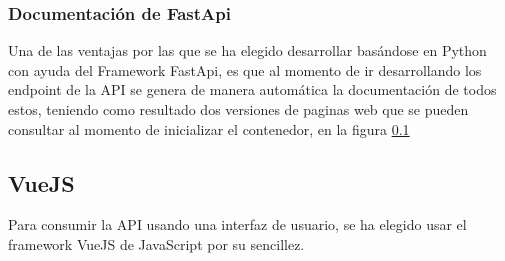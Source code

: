 \clearpage

\subsubsection{Documentación de FastApi}
Una de las ventajas por las que se ha elegido desarrollar basándose en Python con ayuda del Framework FastApi, es que al momento de ir desarrollando los endpoint de la API se genera de manera automática la documentación de todos estos, teniendo como resultado dos versiones de paginas web que se pueden consultar al momento de inicializar el contenedor, en la figura \ref{}

\subsection{VueJS}
Para consumir la API usando una interfaz de usuario, se ha elegido usar el framework VueJS de JavaScript por su sencillez.

